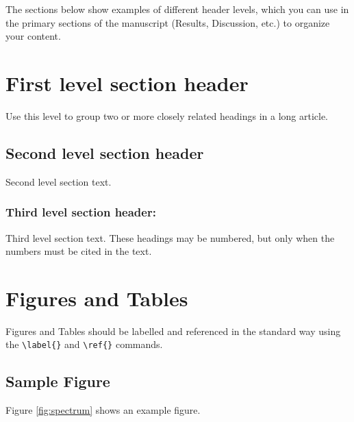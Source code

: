 \documentclass[9pt,twocolumn,twoside]{g3_article/gsag3jnl}
\begin{document}
The sections below show examples of different header levels, which you can use in the primary sections of the manuscript (Results, Discussion, etc.) to organize your content.

\section*{First level section header}

Use this level to group two or more closely related headings in a long article.

\subsection*{Second level section header}

Second level section text.

\subsubsection*{Third level section header:}

Third level section text. These headings may be numbered, but only when the numbers must be cited in the text. 

\section*{Figures and Tables}

Figures and Tables should be labelled and referenced in the standard way using the \verb|\label{}| and \verb|\ref{}| commands.

\subsection*{Sample Figure}

Figure \ref{fig:spectrum} shows an example figure.
\end{document}
